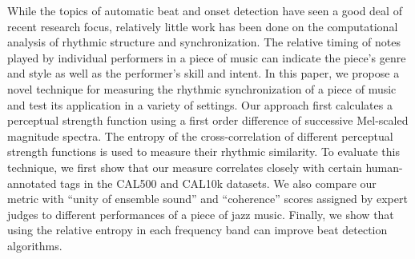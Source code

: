 \documentclass[12pt]{article}
\begin{document}
While the topics of automatic beat and onset detection have seen a good deal of recent research focus, relatively little work has been done on the computational analysis of rhythmic structure and synchronization.  The relative timing of notes played by individual performers in a piece of music can indicate the piece's genre and style as well as the performer's skill and intent.  In this paper, we propose a novel technique for measuring the rhythmic synchronization of a piece of music and test its application in a variety of settings.  Our approach first calculates a perceptual strength function using a first order difference of successive Mel-scaled magnitude spectra.  The entropy of the cross-correlation of different perceptual strength functions is used to measure their rhythmic similarity.  To evaluate this technique, we first show that our measure correlates closely with certain human-annotated tags in the CAL500 and CAL10k datasets.  We also compare our metric with ``unity of ensemble sound'' and ``coherence'' scores assigned by expert judges to different performances of a piece of jazz music.  Finally, we show that using the relative entropy in each frequency band can improve beat detection algorithms.
\end{document}
